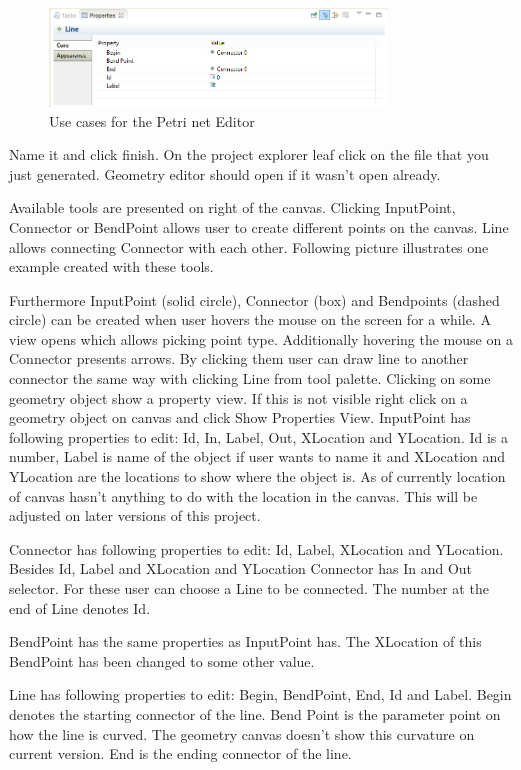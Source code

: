 \begin{figure}[htp]
\begin{center}
  \includegraphics[width=0.8\textwidth]{image/geometry7.png}
  \caption{Use cases for the Petri net Editor}
  \label{fig:geometry7}
\end{center}
\end{figure}

Name it and click finish. On the project explorer leaf click on the file that you just generated. Geometry editor should open if it wasn’t open already.

Available tools are presented on right of the canvas. Clicking InputPoint, Connector or BendPoint allows user to create different points on the canvas. Line allows connecting Connector with each other. Following picture illustrates one example created with these tools.

Furthermore InputPoint (solid circle), Connector (box) and Bendpoints (dashed circle) can be created when user hovers the mouse on the screen for a while. A view opens which allows picking point type. Additionally hovering the mouse on a Connector presents arrows. By clicking them user can draw line to another connector the same way with clicking Line from tool palette.
Clicking on some geometry object show a property view. If this is not visible right click on a geometry object on canvas and click Show Properties View.
InputPoint has following properties to edit: Id, In, Label, Out, XLocation and YLocation. Id is a number, Label is name of the object if user wants to name it and XLocation and YLocation are the locations to show where the object is. As of currently location of canvas hasn’t anything to do with the location in the canvas. This will be adjusted on later versions of this project.

Connector has following properties to edit: Id, Label, XLocation and YLocation. Besides Id, Label and XLocation and YLocation Connector has In and Out selector. For these user can choose a Line to be connected. The number at the end of Line denotes Id.

BendPoint has the same properties as InputPoint has. The XLocation of this BendPoint has been changed to some other value.

Line has following properties to edit: Begin, BendPoint, End, Id and Label. Begin denotes the starting connector of the line. Bend Point is the parameter point on how the line is curved. The geometry canvas doesn’t show this curvature  on current version. End is the ending connector of the line.